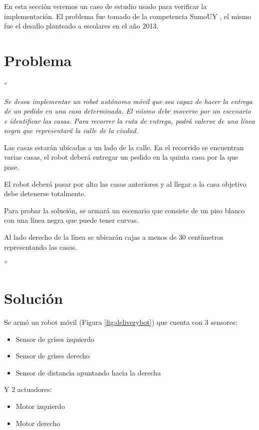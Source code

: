 
  En esta sección veremos un caso de estudio usado para verificar la
implementación.
  El problema fue tomado de la competencia SumoUY \cite{sumouy}, el mismo
fue el desafío planteado a escolares en el año 2013.

\section {Problema}

``{\itshape Se desea implementar un robot autónomo móvil que sea capaz de
hacer la entrega de un pedido en una casa determinada.
  El mismo debe moverse por un escenario e identificar las casas.
  Para recorrer la ruta de entrega, podrá valerse de una línea negra
que representará la calle de la ciudad.

  Las casas estarán ubicadas a un lado de la calle. En el recorrido
se encuentran varias casas, el robot deberá entregar un pedido
en la quinta casa por la que pase.

  El robot deberá pasar por alto las casas anteriores y
al llegar a la casa objetivo debe detenerse totalmente.

  Para probar la solución, se armará un escenario que consiste de
un piso blanco con una línea negra que puede tener curvas.

  Al lado derecho de la línea se ubicarán cajas a menos de 30
centímetros representando las casas.}''

\section {Solución}

Se armó un robot móvil (Figura \ref{fig:deliverybot}) que cuenta con 3 sensores:

\begin{itemize}
\item Sensor de grises izquierdo
\item Sensor de grises derecho
\item Sensor de distancia apuntando hacia la derecha
\end{itemize}

  Y 2 actuadores:

\begin{itemize}
\item Motor izquierdo
\item Motor derecho 
\end{itemize}

